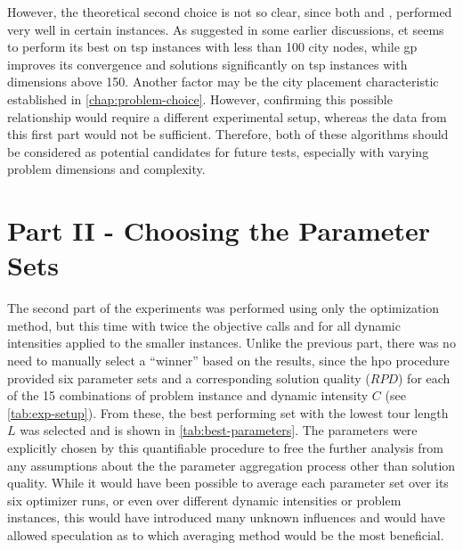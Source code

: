 However, the theoretical second choice is not so clear, since both  and , performed very well in certain instances. As suggested in some earlier discussions, \gls{et} seems to perform its best on \gls{tsp} instances with less than 100 city nodes, while \gls{gp} improves its convergence and solutions significantly on \gls{tsp} instances with dimensions above 150. Another factor may be the city placement characteristic established in \cref{chap:problem-choice}. However, confirming this possible relationship would require a different experimental setup, whereas the data from this first part would not be sufficient. Therefore, both of these algorithms should be considered as potential candidates for future tests, especially with varying problem dimensions and complexity.


\section{Part II - Choosing the Parameter Sets}
\label{chap:part2}

The second part of the experiments was performed using only the  optimization method, but this time with twice the objective calls and for all dynamic intensities applied to the smaller instances. Unlike the previous part, there was no need to manually select a \enquote{winner} based on the results, since the \gls{hpo} procedure provided six parameter sets and a corresponding solution quality ($RPD$) for each of the 15 combinations of problem instance and dynamic intensity $C$ (see \cref{tab:exp-setup}). From these, the best performing set with the lowest tour length $L$ was selected and is shown in \cref{tab:best-parameters}. The parameters were explicitly chosen by this quantifiable procedure to free the further analysis from any assumptions about the the parameter aggregation process other than solution quality. While it would have been possible to average each parameter set over its six optimizer runs, or even over different dynamic intensities or problem instances, this would have introduced many unknown influences and would have allowed speculation as to which averaging method would be the most beneficial.

